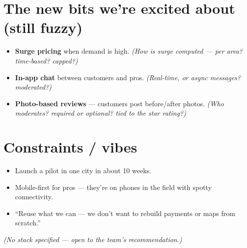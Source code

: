 \documentclass[11pt,a4paper]{article}
\begin{document}
\section*{The new bits we're excited about (still fuzzy)}
\begin{itemize}
  \item \textbf{Surge pricing} when demand is high. \textit{(How is surge computed --- per area? time-based? capped?)}
  \item \textbf{In-app chat} between customers and pros. \textit{(Real-time, or async messages? moderated?)}
  \item \textbf{Photo-based reviews} --- customers post before/after photos. \textit{(Who moderates? required or optional? tied to the star rating?)}
\end{itemize}

\section*{Constraints / vibes}
\begin{itemize}
  \item Launch a pilot in one city in about 10 weeks.
  \item Mobile-first for pros --- they're on phones in the field with spotty connectivity.
  \item ``Reuse what we can --- we don't want to rebuild payments or maps from scratch.''
\end{itemize}

\vspace{8pt}
{\color{soft}\textit{(No stack specified --- open to the team's recommendation.)}}
\end{document}

